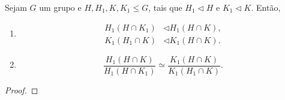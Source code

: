 \documentclass[11pt,openany]{book}
\newenvironment{novo}{
    \color{red}
}{}
\begin{document}
\begin{lemma}
\label{lemma:zassenhaus}
    \begin{novo}
        Sejam $G$ um grupo e $H, H_1, K, K_1 \leq G$, tais que $H_1 \triangleleft H$ e $K_1 \triangleleft K$. Então,
        \begin{enumerate}
            \item \begin{align*}
                H_1(H \cap K_1) &\triangleleft H_1(H \cap K),\\
                K_1(H_1 \cap K) &\triangleleft K_1(H \cap K).
            \end{align*}
            \item \begin{equation*}
                \frac{H_1(H \cap K)}{H_1(H \cap K_1)} \simeq \frac{K_1(H \cap K)}{K_1(H_1 \cap K)}.
            \end{equation*}
        \end{enumerate}
    \end{novo}
\end{lemma}

\begin{novo}
\begin{proof}
    
\end{proof}
\end{novo}
    


\end{document}
